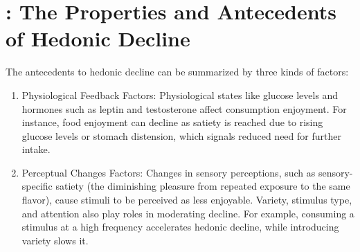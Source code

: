 \documentclass[11pt]{elegantbook}
\begin{document}
\section{\cite{galak2018properties}: The Properties and Antecedents of Hedonic Decline}
The antecedents to hedonic decline can be summarized by three kinds of factors:
\begin{enumerate}
    \item Physiological Feedback Factors: Physiological states like glucose levels and hormones such as leptin and testosterone affect consumption enjoyment. For instance, food enjoyment can decline as satiety is reached due to rising glucose levels or stomach distension, which signals reduced need for further intake.
    \item Perceptual Changes Factors: Changes in sensory perceptions, such as sensory-specific satiety (the diminishing pleasure from repeated exposure to the same flavor), cause stimuli to be perceived as less enjoyable. Variety, stimulus type, and attention also play roles in moderating decline. For example, consuming a stimulus at a high frequency accelerates hedonic decline, while introducing variety slows it.
\end{enumerate}












































































\end{document}
